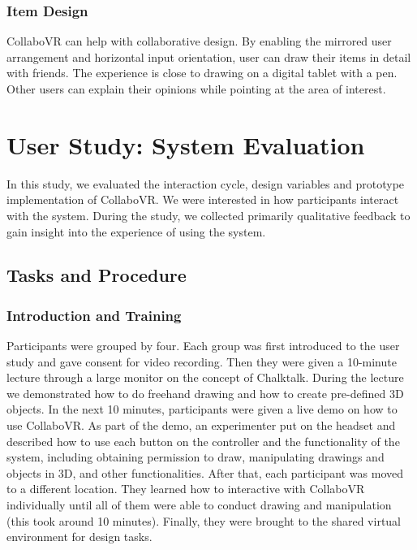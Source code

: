 \documentclass{sigchi}
\begin{document}
\subsubsection{Item Design}
CollaboVR can help with collaborative design. By enabling the mirrored user arrangement and horizontal input orientation, user can draw their items in detail with friends. The experience is close to drawing on a digital tablet with a pen. Other users can explain their opinions while pointing at the area of interest.

\section{User Study: System Evaluation}

In this study, we evaluated the interaction cycle, design variables and prototype implementation of CollaboVR. We were interested in how participants interact with the system. During the study, we collected primarily qualitative feedback to gain insight into the experience of using the system.

\subsection{Tasks and Procedure}
\subsubsection{Introduction and Training}
Participants were grouped by four. Each group was first introduced to the user study and gave consent for video recording. Then they were given a 10-minute lecture through a large monitor on the concept of Chalktalk. During the lecture we demonstrated how to do freehand drawing and how to create pre-defined 3D objects.
In the next 10 minutes, participants were given a live demo on how to use CollaboVR. As part of the demo, an experimenter put on the headset and described how to use each button on the controller and the functionality of the system, including obtaining permission to draw, manipulating drawings and objects in 3D, and other functionalities.
After that, each participant was moved to a different location. They learned how to interactive with CollaboVR individually until all of them were able to conduct drawing and manipulation (this took around 10 minutes). Finally, they were brought to the shared virtual environment for design tasks. 
\end{document}
